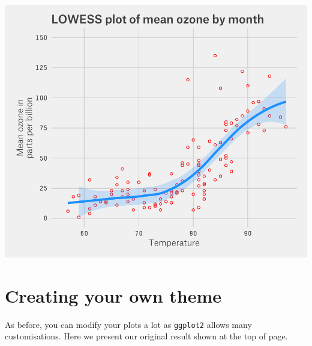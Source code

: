 \documentclass[]{article}
\begin{document}
\begin{center}\includegraphics{12_Lowess_Plots_pdf/lowess_20-1} \end{center}

\section{Creating your own theme}\label{creating-your-own-theme}

As before, you can modify your plots a lot as \texttt{ggplot2} allows
many customisations. Here we present our original result shown at the
top of page.
\end{document}

